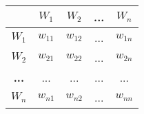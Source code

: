 \vspace{-0.1cm}
\begin{table}[h]
    \centering
    \begin{tabular}{|c|c|c|c|c|}
        \hline
        \textbf{} & \textbf{$W_1$} & \textbf{$W_2$} & \textbf{...} & \textbf{$W_n$} \\
        \hline
        \textbf{$W_1$} & $w_{11}$ & $w_{12}$ & ... & $w_{1n}$ \\
        \textbf{$W_2$} & $w_{21}$ & $w_{22}$ & ... & $w_{2n}$ \\
        \textbf{...} & ... & ... & ... & ... \\
        \textbf{$W_n$} & $w_{n1}$ & $w_{n2}$ & ... & $w_{nn}$ \\
        \hline
    \end{tabular}
\end{table}